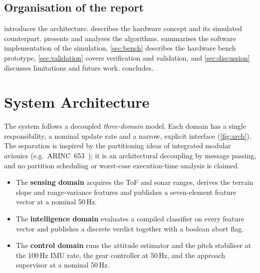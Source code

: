 \documentclass[11pt,a4paper]{article}
\begin{document}
\subsection{Organisation of the report}
 introduces the architecture.  describes the hardware concept and its simulated counterpart.  presents and analyses the algorithms.  summarises the software implementation of the simulation, \cref{sec:bench} describes the hardware bench prototype, \cref{sec:validation} covers verification and validation, and \cref{sec:discussion} discusses limitations and future work.  concludes.
 
\section{System Architecture}\label{sec:arch}
The system follows a decoupled \emph{three-domain} model. Each domain has a single responsibility, a nominal update rate and a narrow, explicit interface (\cref{fig:arch}). The separation is inspired by the partitioning ideas of integrated modular avionics (e.g.\ ARINC~653~\cite{arinc653}); it is an architectural decoupling by message passing, and no partition scheduling or worst-case execution-time analysis is claimed.
 
\begin{itemize}
  \item The \textbf{sensing domain} acquires the ToF and sonar ranges, derives the terrain slope and range-variance features and publishes a seven-element feature vector at a nominal 50\,Hz.
  \item The \textbf{intelligence domain} evaluates a compiled classifier on every feature vector and publishes a discrete verdict together with a boolean abort flag.
  \item The \textbf{control domain} runs the attitude estimator and the pitch stabiliser at the 100\,Hz IMU rate, the gear controller at 50\,Hz, and the approach supervisor at a nominal 50\,Hz.
\end{itemize}
 
\end{document}
